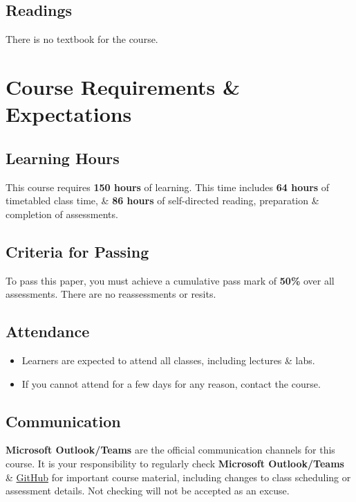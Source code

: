 \documentclass{article}
\begin{document}
\subsection*{Readings}
There is no textbook for the course.

\section*{Course Requirements \& Expectations}

\subsection*{Learning Hours}
This course requires \textbf{150 hours} of learning. This time includes \textbf{64 hours} of timetabled class time, \& \textbf{86 hours} of self-directed reading, preparation \& completion of assessments.

\subsection*{Criteria for Passing}
To pass this paper, you must achieve a cumulative pass mark of \textbf{50\%} over all assessments. There are no reassessments or resits.

\subsection*{Attendance}
\begin{itemize}
	\item Learners are expected to attend all classes, including lectures \& labs.
	\item If you cannot attend for a few days for any reason, contact the course.
\end{itemize}

\subsection*{Communication}
\textbf{Microsoft Outlook/Teams} are the official communication channels for this course. It is your responsibility to regularly check \textbf{Microsoft Outlook/Teams} \& \href{https://github.com/otago-polytechnic-bit-courses/ID607001-intro-app-dev-concepts}{GitHub} for important course material, including changes to class scheduling or assessment details. Not checking will not be accepted as an excuse.
\end{document}
